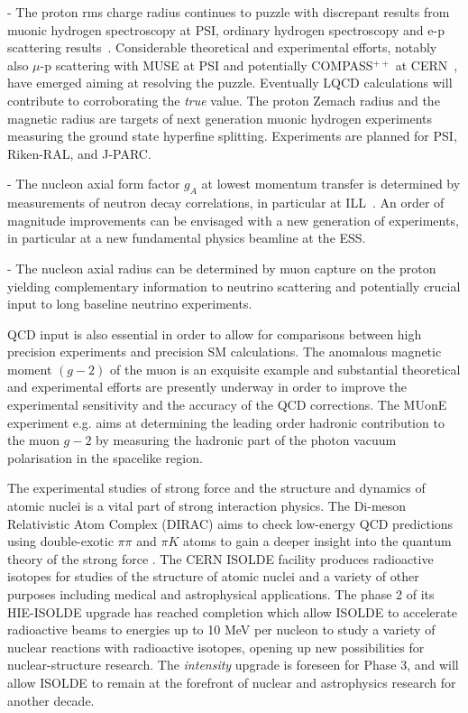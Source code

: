 -          The proton rms charge radius continues to puzzle with discrepant results from muonic hydrogen spectroscopy at PSI, ordinary hydrogen spectroscopy and e-p scattering results~\cite{Antognini:2015moa,Pohl:2010zza,Antognini:2005fe,Bernauer:2010wm,Antognini:1900ns}. Considerable theoretical and experimental efforts, notably also $\mu$-p scattering with MUSE at PSI and potentially COMPASS$^{++}$ at CERN~\cite{Gilman:2013eiv,Denisov:2018unj}, have emerged aiming at resolving the puzzle.  Eventually LQCD calculations will contribute to corroborating the {\it true} value. The proton Zemach radius and the magnetic radius are targets of next generation muonic hydrogen experiments measuring the ground state hyperfine splitting. Experiments are planned for PSI, Riken-RAL, and J-PARC.

-          The nucleon axial form factor $g_A$ at lowest momentum transfer is determined by measurements of neutron decay correlations, in particular at ILL~\cite{Markisch:2018ndu}. An order of magnitude improvements can be envisaged with a new generation of experiments, in particular at a new fundamental physics beamline at the ESS.

-         The nucleon axial radius can be determined by muon capture on the proton~\cite{Hill:2017wgb} yielding complementary information to neutrino scattering and potentially crucial input to long baseline neutrino experiments.

QCD input is also essential in order to allow for comparisons between high precision experiments and precision SM calculations. The anomalous magnetic moment $(g-2)$ of the muon is an exquisite example and substantial theoretical and experimental efforts are presently underway in order to improve the experimental sensitivity and the accuracy of the QCD corrections. The MUonE experiment e.g.  aims at determining the leading order hadronic contribution to the muon $g-2$ by measuring the hadronic part of the photon vacuum polarisation in the spacelike region. 

The  experimental studies of  strong force and  the structure and dynamics of atomic nuclei is a vital part of strong interaction physics.
The Di-meson Relativistic Atom Complex (DIRAC)  aims to check
low-energy QCD predictions using double-exotic $\pi\pi$ and $\pi K$ atoms 
to  gain a deeper insight into the quantum theory of the strong force \cite{Adeva:2018fwr,DIRAC:2016rpv}.
The CERN ISOLDE facility  produces radioactive isotopes for studies of the structure of atomic nuclei and a variety of other purposes including medical and astrophysical applications. The phase 2 of its HIE-ISOLDE upgrade has reached completion which 
 allow ISOLDE to accelerate radioactive beams to energies up to 10 MeV per nucleon  to study a variety of nuclear reactions with radioactive isotopes, opening up new possibilities for nuclear-structure research. The {\it intensity} upgrade is foreseen for Phase 3, and will allow ISOLDE to remain at the forefront of nuclear and astrophysics research for  another decade. 



